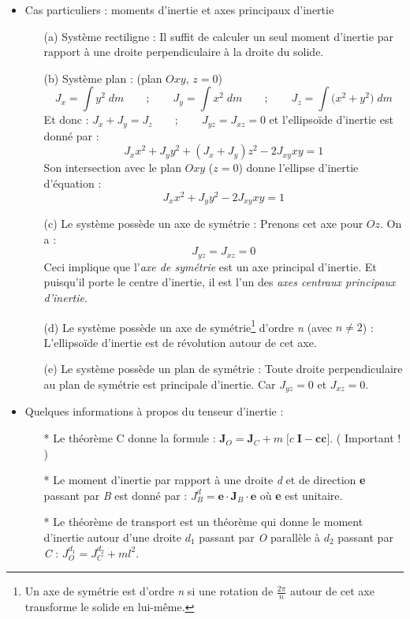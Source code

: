 \documentclass[a4paper]{article}
\begin{document}
\begin{itemize}
\item Cas particuliers : moments d'inertie et axes principaux d'inertie
\begin{enumerate}
\item[(a)] Système rectiligne : Il suffit de calculer un seul moment d'inertie par rapport à une droite perpendiculaire à la droite du solide.
\item[(b)] Système plan : (plan $ Oxy $, $ z = 0 $)
\[ J_x = \int y^2 \; d m \qquad ; \qquad J_y = \int x^2 \; d m \qquad ; \qquad J_z = \int \Big( x^2 + y^2 \Big) \; d m \]
Et donc : $\displaystyle J_x + J_y = J_z \qquad ; \qquad J_{y z} = J_{x z} = 0 $ et l'ellipsoïde d'inertie est donné par : 
\[ J_x x^2 + J_y y^2 + (J_x + J_y) z^2 - 2 J_{x y} x y = 1 \]
Son intersection avec le plan $ Oxy $ ($ z = 0 $) donne l'ellipse d'inertie d'équation : 
\[ J_x x^2 + J_y y^2 - 2 J_{x y} x y = 1 \]
\item[(c)] Le système possède un axe de symétrie : Prenons cet axe pour $ Oz $. On a : 
\[ J_{y z} = J_{x z} = 0 \]
Ceci implique que l'\emph{axe de symétrie} est un axe principal d'inertie. Et puisqu'il porte le centre d'inertie, il est l'un des \emph{axes centraux principaux d'inertie}.
\item[(d)] Le système possède un axe de symétrie\footnote{Un axe de symétrie est d'ordre \emph{n} si une rotation de $\displaystyle \frac{2 \pi}{n} $ autour de cet axe transforme le solide en lui-même.} d'ordre \emph{n} (avec $ n \neq 2 $) : L'ellipsoïde d'inertie est de révolution autour de cet axe.
\item[(e)] Le système possède un plan de symétrie : Toute droite perpendiculaire au plan de symétrie est principale d'inertie. Car $ J_{y z} = 0 $ et $ J_{x z} = 0 $.
\end{enumerate}





\item Quelques informations à propos du tenseur d'inertie : 
\begin{itemize}
    \item[*] Le théorème C donne la formule : $\displaystyle \textbf{J}_O = \textbf{J}_C + m \; \Big[ c \; \textbf{I} - \textbf{c} \textbf{c} \Big] $. \qquad \big( \danger Important ! \big)
    \item[*] Le moment d'inertie par rapport à une droite \emph{d} et de direction \textbf{e} passant par \emph{B} est donné par : $ J_B^d = \textbf{e} \cdot \textbf{J}_B \cdot \textbf{e} $ \qquad où \textbf{e} est unitaire.
    \item[*] Le théorème de transport est un théorème qui donne le moment d'inertie autour d'une droite $ d_1 $ passant par \emph{O} parallèle à $ d_2 $ passant par \emph{C} : $\displaystyle J_O^{d_1} = J_C^{d_2} + m l^2 $.

\end{itemize}






\end{itemize}
\end{document}
